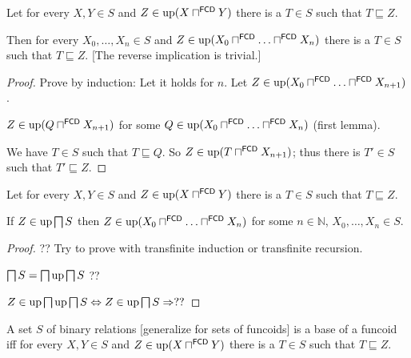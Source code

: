 \begin{lem}
  Let for every $X, Y \in S$ and $Z \in \operatorname{up} (X
  \sqcap^{\mathsf{FCD}} Y)$ there is a $T \in S$ such that $T
  \sqsubseteq Z$.
  
  Then for every $X_0, \ldots, X_n \in S$ and $Z \in \operatorname{up} (X_0
  \sqcap^{\mathsf{FCD}} \ldots \sqcap^{\mathsf{FCD}} X_n)$ there
  is a $T \in S$ such that $T \sqsubseteq Z$. [The reverse implication is
  trivial.]
\end{lem}

\begin{proof}
Prove by induction: Let it holds for $n$. Let $Z \in \operatorname{up} (X_0
\sqcap^{\mathsf{FCD}} \ldots \sqcap^{\mathsf{FCD}} X_{n + 1})$.

$Z \in \operatorname{up} (Q \sqcap^{\mathsf{FCD}} X_{n + 1})$ for some $Q \in
\operatorname{up} (X_0 \sqcap^{\mathsf{FCD}} \ldots
\sqcap^{\mathsf{FCD}} X_n)$ (first lemma).

We have $T \in S$ such that $T \sqsubseteq Q$. So $Z \in \operatorname{up} (T
\sqcap^{\mathsf{FCD}} X_{n + 1})$; thus there is $T' \in S$ such that
$T' \sqsubseteq Z$.
\end{proof}

\begin{lem}
  Let for every $X, Y \in S$ and $Z \in \operatorname{up} (X
  \sqcap^{\mathsf{FCD}} Y)$ there is a $T \in S$ such that $T
  \sqsubseteq Z$.
  
  If $Z \in \operatorname{up} \bigsqcap S$ then $Z \in \operatorname{up} (X_0
  \sqcap^{\mathsf{FCD}} \ldots \sqcap^{\mathsf{FCD}} X_n)$ for
  some $n \in \mathbb{N}$, $X_0, \ldots, X_n \in S$.
\end{lem}

\begin{proof}
  ?? Try to prove with transfinite induction or transfinite recursion.

  $\bigsqcap S = \bigsqcap \operatorname{up} \bigsqcap S$ ??
  
  $Z \in \operatorname{up} \bigsqcap \operatorname{up} \bigsqcap S \Leftrightarrow Z \in
  \operatorname{up} \bigsqcap S \Rightarrow ? ?$
\end{proof}

\begin{prop}
  A set $S$ of binary relations [generalize for sets of funcoids] is a base of
  a funcoid iff for every $X, Y \in S$ and $Z \in \operatorname{up} (X
  \sqcap^{\mathsf{FCD}} Y)$ there is a $T \in S$ such that $T
  \sqsubseteq Z$.
\end{prop}

